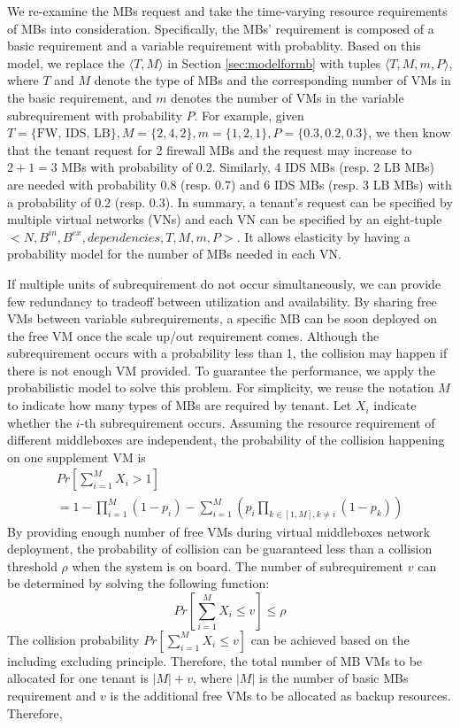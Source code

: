 \documentclass[review]{elsarticle}
\begin{document}
We re-examine the MBs request and take the time-varying resource requirements of MBs into consideration. Specifically, the MBs' requirement is composed of a basic requirement and a variable requirement with probablity. Based on this model, we replace the $\langle T, M \rangle$ in Section \ref{sec:modelformb} with tuples $\langle T, M, m, P\rangle$, where $T$ and $M$  denote the type of MBs and the corresponding number of VMs in the basic requirement, and $m$ denotes the number of VMs in the variable subrequirement with probability $P$. For example, given $T=\{\text{FW, IDS, LB}\}, M=\{ 2, 4, 2\}, m=\{1, 2, 1\}, P=\{0.3, 0.2, 0.3\}$, we then know that the tenant request for 2 firewall MBs and the request may increase to $2+1=3$ MBs with probability of 0.2. Similarly, 4 IDS MBs (resp. 2 LB MBs) are needed with probability 0.8 (resp. 0.7) and 6 IDS MBs (resp. 3 LB MBs) with a probability of 0.2 (resp. 0.3). In summary, a tenant's request can be specified by multiple virtual networks (VNs) and each VN can be specified by an eight-tuple $<N, B^{in}, B^{ex}, dependencies, T, M, m, P>$. It allows elasticity by having a probability model for the number of MBs needed in each VN. 

If multiple units of subrequirement do not occur simultaneously, we can provide few redundancy to tradeoff between utilization and availability. By sharing free VMs between variable subrequirements, a specific MB can be soon deployed on the free VM once the scale up/out requirement comes. Although the subrequirement occurs with a probability less than 1, the collision may happen if there is not enough VM provided. To guarantee the performance, we apply the probabilistic model to solve this problem. For simplicity, we reuse the notation $M$ to indicate how many types of MBs are required by tenant. Let $X_{i}$ indicate whether the $i$-th subrequirement occurs. Assuming the resource requirement of different middleboxes are independent, the probability of the collision happening on one supplement VM is
\begin{align}
&Pr\left[ \sum_{i=1}^{M} X_{i} > 1 \right] & \nonumber \\
&= 1-\prod_{i=1}^{M}(1-p_{i})-\sum_{i=1}^{M}\left(p_{i}\prod_{k\in[1,M], k\neq i}(1-p_{k})\right)&
\end{align}
By providing enough number of free VMs during virtual middleboxes network deployment, the probability of collision can be guaranteed less than a collision threshold $\rho$ when the system is on board. The number of subrequirement $v$ can be determined by solving the following function:
\begin{equation}\label{equ:collision}  
		Pr\left[ \sum_{i=1}^{M} X_{i} \leq v \right] \leq \rho
\end{equation}
The collision probability $Pr\left[ \sum_{i=1}^{M} X_{i} \leq v \right]$ can be achieved based on the including excluding principle. Therefore, the total number of MB VMs to be allocated for one tenant is $|M|+v$, where $|M|$ is the number of basic MBs requirement and $v$ is the additional free VMs to be allocated as backup resources. Therefore, 
\end{document}
